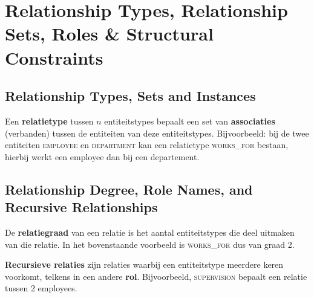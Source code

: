 \section{Relationship Types, Relationship Sets, Roles \& Structural Constraints}
\subsection{Relationship Types, Sets and Instances}
Een \textbf{relatietype} tussen $n$ entiteitstypes bepaalt een set van \textbf{associaties} (verbanden) tussen de entiteiten van deze entiteitstypes. Bijvoorbeeld: bij de twee entiteiten \textsc{employee} en \textsc{department} kan een relatietype \textsc{works\_for} bestaan, hierbij werkt een employee dan bij een departement.

\subsection{Relationship Degree, Role Names, and Recursive Relationships}
De \textbf{relatiegraad} van een relatie is het aantal entiteitstypes die deel uitmaken van die relatie. In het bovenstaande voorbeeld is \textsc{works\_for} dus van graad 2.

\textbf{Recursieve relaties} zijn relaties waarbij een entiteitstype meerdere keren voorkomt, telkens in een andere \textbf{rol}. Bijvoorbeeld, \textsc{supervision} bepaalt een relatie tussen 2 employees.


